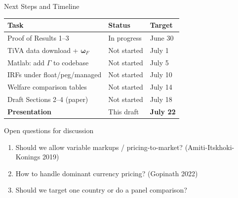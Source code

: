 \documentclass[aspectratio=169]{beamer}
\begin{document}
\begin{frame}{Next Steps and Timeline}

\begin{center}
\begin{tabular}{lll}
\toprule
\textbf{Task} & \textbf{Status} & \textbf{Target} \\
\midrule
Proof of Results 1--3 & In progress & June 30 \\
TiVA data download + $\bm{\omega}_F$ & Not started & July 1 \\
Matlab: add $\Gamma$ to codebase & Not started & July 5 \\
IRFs under float/peg/managed & Not started & July 10 \\
Welfare comparison tables & Not started & July 14 \\
Draft Sections 2--4 (paper) & Not started & July 18 \\
\textbf{Presentation} & This draft & \textbf{July 22} \\
\bottomrule
\end{tabular}
\end{center}

\vspace{0.3cm}
\begin{alertblock}{Open questions for discussion}
\begin{enumerate}
    \item Should we allow variable markups / pricing-to-market? (Amiti-Itskhoki-Konings 2019)
    \item How to handle dominant currency pricing? (Gopinath 2022)
    \item Should we target one country or do a panel comparison?
\end{enumerate}
\end{alertblock}
\end{frame}
\end{document}
